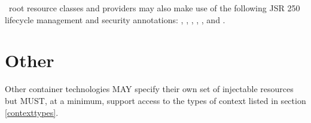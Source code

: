 \jaxrs\ root resource classes and providers may also make use of the following JSR 250 lifecycle management and security annotations:  , , , , ,  and .

\section{Other}

Other container technologies MAY specify their own set of injectable resources but MUST, at a minimum, support access to the types of context listed in section \ref{contexttypes}.